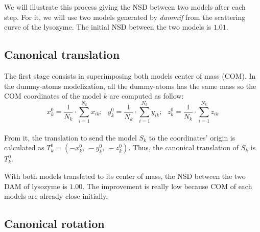\documentclass[a4paper, 11pt]{report}
\begin{document}
We will illustrate this process giving the NSD between two models 
after each step. 
For it, we will use two models generated by \textit{dammif} from the 
scattering curve of the lysozyme. 
The initial NSD between the two models is $1.01$.

\subsection{Canonical translation}

The first stage consists in superimposing both models center of mass 
(COM). 
In the dummy-atoms modelization, all the dummy-atoms has the same mass 
so the COM coordinates of the model $k$ are computed as follow:
\[
x_{k}^0 = \frac{1}{N_{k}} \cdot \sum\limits_{i=1}^{N_{k}} x_{ik};\ \ \ 
y_{k}^0 = \frac{1}{N_{k}} \cdot \sum\limits_{i=1}^{N_{k}} y_{ik};\ \ \ 
z_{k}^0 = \frac{1}{N_{k}} \cdot \sum\limits_{i=1}^{N_{k}} z_{ik}
\]\\
From it, the translation to send the model $S_{k}$ to the coordinates' 
origin is calculated as $T_{k}^0 = (-x_{k}^0,\ -y_{k}^0,\ -z_{k}^0)$. 
Thus, the canonical translation of $S_{k}$ is $T_{k}^0$.

With both models translated to its center of mass, the NSD between the 
two DAM of lysozyme is $1.00$. 
The improvement is really low because COM of each models are already 
close initially.

\subsection{Canonical rotation}
\end{document}
